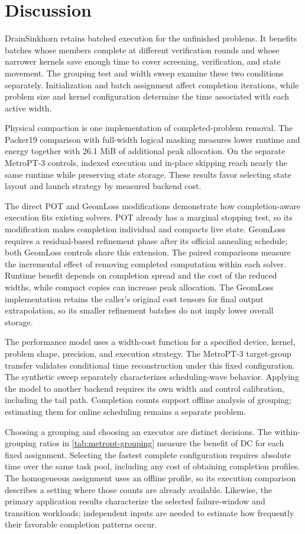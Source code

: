 \section{Discussion}
\label{sec:scope}

DrainSinkhorn retains batched execution for the unfinished problems. It benefits batches whose members complete at different verification rounds and whose narrower kernels save enough time to cover screening, verification, and state movement. The grouping test and width sweep examine these two conditions separately. Initialization and batch assignment affect completion iterations, while problem size and kernel configuration determine the time associated with each active width.

Physical compaction is one implementation of completed-problem removal. The Packer19 comparison with full-width logical masking measures lower runtime and energy together with 26.1 MiB of additional peak allocation. On the separate MetroPT-3 controls, indexed execution and in-place skipping reach nearly the same runtime while preserving state storage. These results favor selecting state layout and launch strategy by measured backend cost.

The direct POT and GeomLoss modifications demonstrate how completion-aware execution fits existing solvers. POT already has a marginal stopping test, so its modification makes completion individual and compacts live state. GeomLoss requires a residual-based refinement phase after its official annealing schedule; both GeomLoss controls share this extension. The paired comparisons measure the incremental effect of removing completed computation within each solver. Runtime benefit depends on completion spread and the cost of the reduced widths, while compact copies can increase peak allocation. The GeomLoss implementation retains the caller's original cost tensors for final output extrapolation, so its smaller refinement batches do not imply lower overall storage.

The performance model uses a width-cost function for a specified device, kernel, problem shape, precision, and execution strategy. The MetroPT-3 target-group transfer validates conditional time reconstruction under this fixed configuration. The synthetic sweep separately characterizes scheduling-wave behavior. Applying the model to another backend requires its own width and control calibration, including the tail path. Completion counts support offline analysis of grouping; estimating them for online scheduling remains a separate problem.

Choosing a grouping and choosing an executor are distinct decisions. The within-grouping ratios in \cref{tab:metropt-grouping} measure the benefit of DC for each fixed assignment. Selecting the fastest complete configuration requires absolute time over the same task pool, including any cost of obtaining completion profiles. The homogeneous assignment uses an offline profile, so its execution comparison describes a setting where those counts are already available. Likewise, the primary application results characterize the selected failure-window and transition workloads; independent inputs are needed to estimate how frequently their favorable completion patterns occur.
